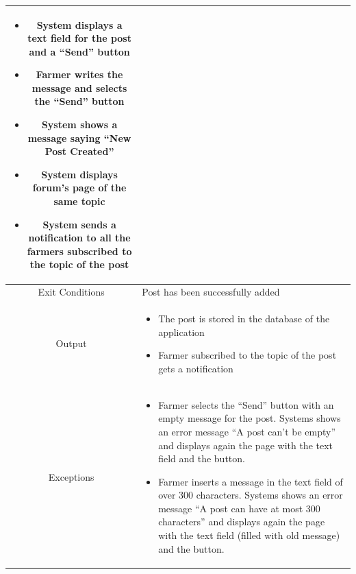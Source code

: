 \documentclass{article}
\begin{document}
\begin{center}
\begin{longtable}{|c| p{10cm}|}
\begin{itemize}
                                \item System displays a text field for the post and a “Send” button
                                \item Farmer writes the message and selects the “Send” button
                                \item System shows a message saying “New Post Created”
                                \item System displays forum’s page of the same topic
                                \item System sends a notification to all the farmers subscribed to the topic of the post
                            \end{itemize} \\
        \hline
            Exit Conditions & Post has been successfully added\\
        \hline
            Output &    \begin{itemize}
                            \item The post is stored in the database of the application
                            \item Farmer subscribed to the topic of the post gets a notification
                        \end{itemize}\\
        \hline
            Exceptions &    \begin{itemize}
                                \item Farmer selects the “Send” button with an empty message for the post. Systems shows an error message “A post can’t be empty” and displays again the page with the text field and the button.
                                \item Farmer inserts a message in the text field of over 300 characters. Systems shows an error message “A post can have at most 300 characters” and displays again the page with the text field (filled with old message) and the button.
                            \end{itemize} \\
        \hline
    \end{longtable}
    
    \newpage


\end{center}
\end{document}
